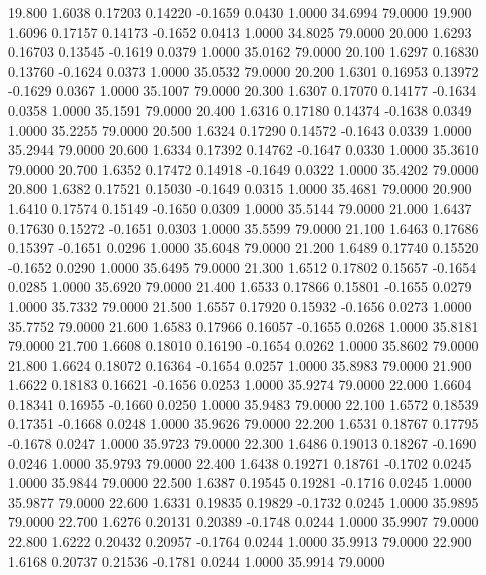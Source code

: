   19.800   1.6038   0.17203   0.14220  -0.1659   0.0430   1.0000  34.6994  79.0000
  19.900   1.6096   0.17157   0.14173  -0.1652   0.0413   1.0000  34.8025  79.0000
  20.000   1.6293   0.16703   0.13545  -0.1619   0.0379   1.0000  35.0162  79.0000
  20.100   1.6297   0.16830   0.13760  -0.1624   0.0373   1.0000  35.0532  79.0000
  20.200   1.6301   0.16953   0.13972  -0.1629   0.0367   1.0000  35.1007  79.0000
  20.300   1.6307   0.17070   0.14177  -0.1634   0.0358   1.0000  35.1591  79.0000
  20.400   1.6316   0.17180   0.14374  -0.1638   0.0349   1.0000  35.2255  79.0000
  20.500   1.6324   0.17290   0.14572  -0.1643   0.0339   1.0000  35.2944  79.0000
  20.600   1.6334   0.17392   0.14762  -0.1647   0.0330   1.0000  35.3610  79.0000
  20.700   1.6352   0.17472   0.14918  -0.1649   0.0322   1.0000  35.4202  79.0000
  20.800   1.6382   0.17521   0.15030  -0.1649   0.0315   1.0000  35.4681  79.0000
  20.900   1.6410   0.17574   0.15149  -0.1650   0.0309   1.0000  35.5144  79.0000
  21.000   1.6437   0.17630   0.15272  -0.1651   0.0303   1.0000  35.5599  79.0000
  21.100   1.6463   0.17686   0.15397  -0.1651   0.0296   1.0000  35.6048  79.0000
  21.200   1.6489   0.17740   0.15520  -0.1652   0.0290   1.0000  35.6495  79.0000
  21.300   1.6512   0.17802   0.15657  -0.1654   0.0285   1.0000  35.6920  79.0000
  21.400   1.6533   0.17866   0.15801  -0.1655   0.0279   1.0000  35.7332  79.0000
  21.500   1.6557   0.17920   0.15932  -0.1656   0.0273   1.0000  35.7752  79.0000
  21.600   1.6583   0.17966   0.16057  -0.1655   0.0268   1.0000  35.8181  79.0000
  21.700   1.6608   0.18010   0.16190  -0.1654   0.0262   1.0000  35.8602  79.0000
  21.800   1.6624   0.18072   0.16364  -0.1654   0.0257   1.0000  35.8983  79.0000
  21.900   1.6622   0.18183   0.16621  -0.1656   0.0253   1.0000  35.9274  79.0000
  22.000   1.6604   0.18341   0.16955  -0.1660   0.0250   1.0000  35.9483  79.0000
  22.100   1.6572   0.18539   0.17351  -0.1668   0.0248   1.0000  35.9626  79.0000
  22.200   1.6531   0.18767   0.17795  -0.1678   0.0247   1.0000  35.9723  79.0000
  22.300   1.6486   0.19013   0.18267  -0.1690   0.0246   1.0000  35.9793  79.0000
  22.400   1.6438   0.19271   0.18761  -0.1702   0.0245   1.0000  35.9844  79.0000
  22.500   1.6387   0.19545   0.19281  -0.1716   0.0245   1.0000  35.9877  79.0000
  22.600   1.6331   0.19835   0.19829  -0.1732   0.0245   1.0000  35.9895  79.0000
  22.700   1.6276   0.20131   0.20389  -0.1748   0.0244   1.0000  35.9907  79.0000
  22.800   1.6222   0.20432   0.20957  -0.1764   0.0244   1.0000  35.9913  79.0000
  22.900   1.6168   0.20737   0.21536  -0.1781   0.0244   1.0000  35.9914  79.0000
